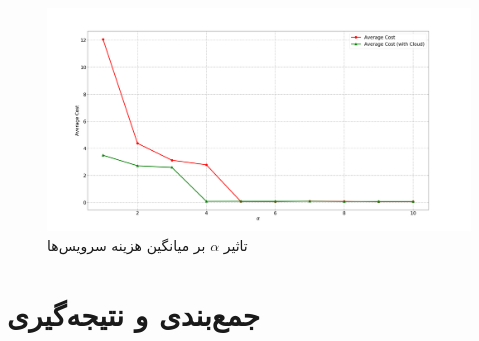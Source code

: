     \begin{figure}[H]
      \centerline{\includegraphics[width=17cm]{graphics/many_to_many/sim_8}}
      \caption{تاثیر $\alpha$ بر میانگین هزینه سرویس‌ها}
      \label{fig:many_to_many:sim8}
    \end{figure}

  \section{جمع‌بندی و نتیجه‌گیری}
    

